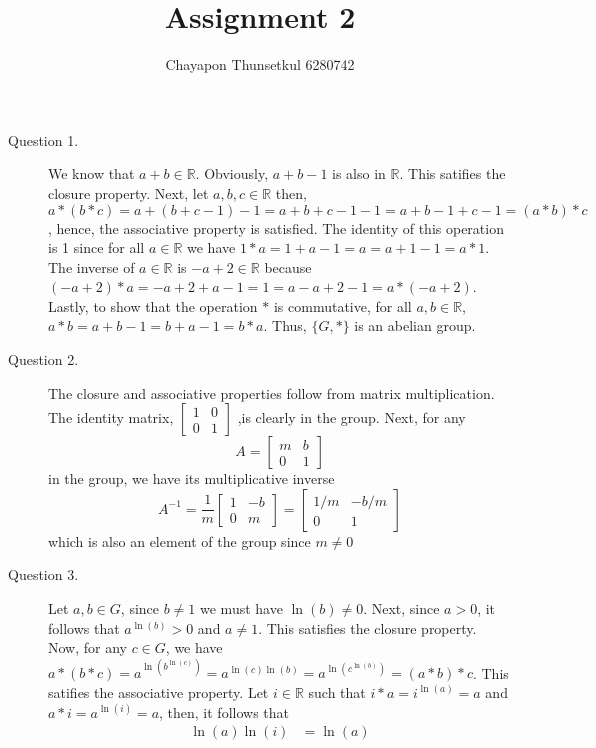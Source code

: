 \documentclass[]{article}
\title{Assignment 2}
\author{Chayapon Thunsetkul 6280742}
\newcommand{\R}{\mathbb{R}}
\begin{document}
\maketitle
\begin{description}
    \item[Question 1.] We know that $a+b \in \mathbb{R}$. Obviously, $a+b-1$ is also in $\mathbb{R}$. This satifies the closure property. Next, let $a,b,c \in \mathbb{R}$ then, $a * (b*c) = a + (b+c -1) -1 = a+ b + c -1 -1 = a+b-1 + c -1 = (a*b)*c$, hence, the associative property is satisfied. The identity of this operation is 1 since for all $a\in \mathbb{R}$ we have $1 * a = 1+ a - 1 = a = a+ 1 - 1 = a*1$. The inverse of $a \in \R$ is $-a+2 \in \R$ because $(-a+2)*a = -a+2 + a -1 = 1 = a - a + 2 - 1 = a * (-a+2)$. Lastly, to show that the operation $*$ is commutative, for all $a,b \in \R$, $a*b = a + b -1 = b + a -1 = b*a$. Thus, $\{G,*\}$ is an abelian group.
    \item[Question 2.] The closure and associative properties follow from matrix multiplication. The identity matrix, $\left[\begin{matrix}
        1&0\\0&1
    \end{matrix} \right]$ ,is clearly in the group. Next, for any  \[
        A  = \begin{bmatrix}
            m & b \\ 0&1
        \end{bmatrix}
    \]  in the group, we have its multiplicative inverse \[
    A^{-1}  =
        \frac{1}{m}  
\begin{bmatrix}
    1 & -b \\ 0 & m
    \end{bmatrix} =
\begin{bmatrix}
    1/m & -b/m \\ 0 & 1
    \end{bmatrix} 
    \] which is also an element of the group since $m\neq 0$
    \item[Question 3.] Let $a,b \in G$, since $b \neq 1$ we must have $\ln(b)\neq 0$. Next, since $a > 0$, it follows that $a^{\ln(b)} > 0$ and $ a\neq 1$. This satisfies the closure property. Now, for any $c \in G$, we have $a*(b*c) = a^{\ln(b^{\ln(c)})} =  a^{\ln(c)\ln(b)}= a^{\ln(c^{\ln(b)})} = (a*b)*c$. This satifies the associative property.
    Let $i \in \R$ such that $i*a = i^{\ln(a) }=a$ and $a*i = a^{\ln(i) }=a$, then, it follows that \begin{align*}
        \ln(a)\ln(i) &= \ln(a)\\

\end{align*}
\end{description}
\end{document}
